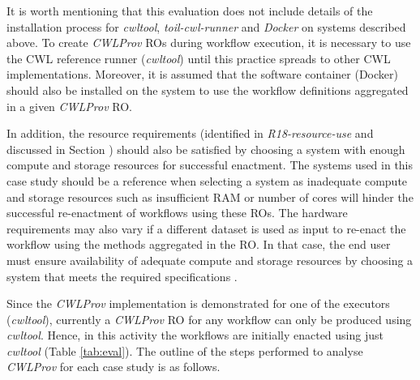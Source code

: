 \documentclass[a4paper,num-refs]{oup-contemporary}
\begin{document}
It is worth mentioning that this evaluation does not include details of the installation process for \textit{cwltool}, \textit{toil-cwl-runner} and \textit{Docker} on systems described above. To create \textit{CWLProv} ROs during workflow execution, it is necessary to use the CWL reference runner (\textit{cwltool}) until this practice spreads to other CWL implementations. Moreover, it is assumed that the software container (Docker) should also be installed on the system to use the workflow definitions aggregated in a given \textit{CWLProv} RO. 

In addition, the resource requirements (identified in \textit{R18-resource-use} and discussed in Section \textbf{}) should also be satisfied by choosing a system with enough compute and storage resources for successful enactment. The systems used in this case study should be a reference when selecting a system as inadequate compute and storage resources such as insufficient RAM or number of cores will hinder the successful re-enactment of workflows using these ROs. The hardware requirements may also vary if a different dataset is used as input to re-enact the workflow using the methods aggregated in the RO. In that case, the end user must ensure availability of adequate compute and storage resources by choosing a system that meets the required specifications \citep{kanwal2017digital}. 

Since the \textit{CWLProv} implementation is demonstrated for one of the executors (\textit{cwltool}), currently a \textit{CWLProv} RO for any workflow can only be produced using \textit{cwltool}. Hence, in this activity the workflows are initially enacted using just \textit{cwltool} (Table \ref{tab:eval}). The outline of the steps performed to analyse \textit{CWLProv} for each case study is as follows. 
\end{document}
